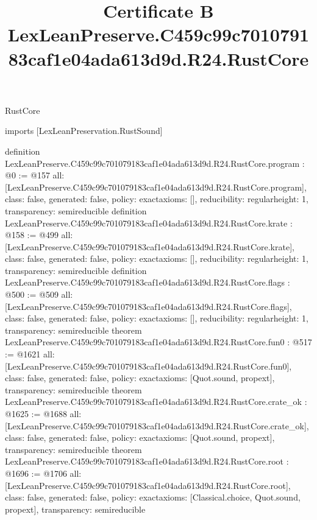 \begin{lexlean}{RustCore}
\title{Certificate B LexLeanPreserve.C459c99c701079183caf1e04ada613d9d.R24.RustCore}
\begin{coremodule}
imports [LexLeanPreservation.RustSound]

definition LexLeanPreserve.C459c99c701079183caf1e04ada613d9d.R24.RustCore.program : @0 := @157 {
  all: [LexLeanPreserve.C459c99c701079183caf1e04ada613d9d.R24.RustCore.program],
  class: false,
  generated: false,
  policy: exact{axioms: []},
  reducibility: regular{height: 1},
  transparency: semireducible
}
definition LexLeanPreserve.C459c99c701079183caf1e04ada613d9d.R24.RustCore.krate : @158 := @499 {
  all: [LexLeanPreserve.C459c99c701079183caf1e04ada613d9d.R24.RustCore.krate],
  class: false,
  generated: false,
  policy: exact{axioms: []},
  reducibility: regular{height: 1},
  transparency: semireducible
}
definition LexLeanPreserve.C459c99c701079183caf1e04ada613d9d.R24.RustCore.flags : @500 := @509 {
  all: [LexLeanPreserve.C459c99c701079183caf1e04ada613d9d.R24.RustCore.flags],
  class: false,
  generated: false,
  policy: exact{axioms: []},
  reducibility: regular{height: 1},
  transparency: semireducible
}
theorem LexLeanPreserve.C459c99c701079183caf1e04ada613d9d.R24.RustCore.fun0 : @517 := @1621 {
  all: [LexLeanPreserve.C459c99c701079183caf1e04ada613d9d.R24.RustCore.fun0],
  class: false,
  generated: false,
  policy: exact{axioms: [Quot.sound, propext]},
  transparency: semireducible
}
theorem LexLeanPreserve.C459c99c701079183caf1e04ada613d9d.R24.RustCore.crate_ok : @1625 := @1688 {
  all: [LexLeanPreserve.C459c99c701079183caf1e04ada613d9d.R24.RustCore.crate_ok],
  class: false,
  generated: false,
  policy: exact{axioms: [Quot.sound, propext]},
  transparency: semireducible
}
theorem LexLeanPreserve.C459c99c701079183caf1e04ada613d9d.R24.RustCore.root : @1696 := @1706 {
  all: [LexLeanPreserve.C459c99c701079183caf1e04ada613d9d.R24.RustCore.root],
  class: false,
  generated: false,
  policy: exact{axioms: [Classical.choice, Quot.sound, propext]},
  transparency: semireducible
}


\end{coremodule}
\end{lexlean}
